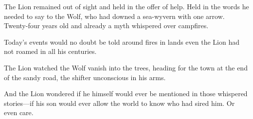 The Lion remained out of sight and held in the offer of help. Held in the words he needed to say to the Wolf, who had downed a sea-wyvern with one arrow. Twenty-four years old and already a myth whispered over campfires.

Today's events would no doubt be told around fires in lands even the Lion had not roamed in all his centuries.

The Lion watched the Wolf vanish into the trees, heading for the town at the end of the sandy road, the shifter unconscious in his arms.

And the Lion wondered if he himself would ever be mentioned in those whispered stories---if his son would ever allow the world to know who had sired him. Or even care.
